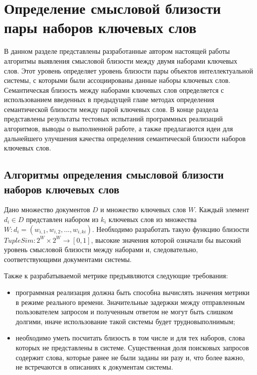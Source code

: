 \chapter{Определение смысловой близости пары наборов ключевых слов} \label{chapt_tuple_similarity}
В данном разделе представлены разработанные автором настоящей работы алгоритмы выявления смысловой близости между двумя наборами ключевых слов.  Этот уровень определяет уровень близости пары объектов интеллектуальной системы, с которыми были ассоциированы данные наборы ключевых слов.
Семантическая близость между наборами ключевых слов определяется с использованием введенных в предыдущей главе методах определения семантической близости между парой ключевых слов.
В конце раздела представлены результаты тестовых испытаний программных реализаций алгоритмов, выводы о выполненной работе, а также предлагаются идеи для дальнейшего улучшения качества определения семантической близости наборов ключевых слов.

\section{Алгоритмы определения смысловой близости наборов ключевых слов}

Дано множество документов $D$ и множество ключевых слов $W$. Каждый элемент $d_i \in D$ представлен набором из $k_i$ ключевых слов из множества $W: d_i = (w_{i,1},w_{i,2},...,w_{i,ki})$. Необходимо разработать такую функцию близости $TupleSim : 2^W \times 2^W \rightarrow [0, 1]$, высокие значения которой означали бы высокий уровень смысловой близости между наборами и, следовательно, соответствующими документами системы. 

Также к разрабатываемой метрике предъявляются следующие требования:
\begin{itemize}
    \item программная реализация должна быть способна вычислять значения метрики в режиме реального времени. Значительные задержки между отправленным пользователем запросом и полученным ответом не могут быть слишком долгими, иначе использование такой системы будет трудновыполнимым;
    \item необходимо уметь посчитать близость в том числе и для тех наборов, слова которых не представлены в системе. Существенная доля поисковых запросов содержит слова, которые ранее не были заданы ни разу и, что более важно, не встречаются в описаниях к документам системы.
\end{itemize}


